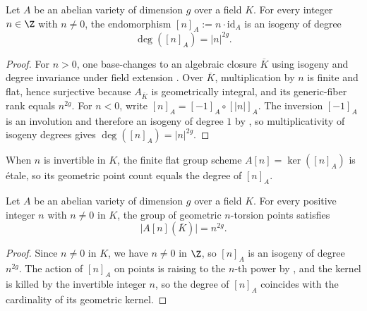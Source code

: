 \begin{theorem}
\label{thm:mul-isogeny}
Let $A$ be an abelian variety of dimension $g$ over a field $K$. For every
integer $n \in \Z$ with $n \neq 0$, the endomorphism $[n]_A := n \cdot \mathrm{id}_A$
is an isogeny of degree
\[
  \deg([n]_A) = |n|^{2g}.
\]
\end{theorem}

\begin{proof}
For $n > 0$, one base-changes to an algebraic closure $\overline{K}$ using
isogeny and degree invariance under field extension
. Over
$\overline{K}$, multiplication by $n$ is finite and flat, hence surjective
because $A_{\overline{K}}$ is geometrically integral, and its generic-fiber
rank equals $n^{2g}$. For $n < 0$, write $[n]_A = [-1]_A \circ [|n|]_A$. The
inversion $[-1]_A$ is an involution and therefore an isogeny of degree $1$ by
, so multiplicativity of isogeny
degrees gives $\deg([n]_A) = |n|^{2g}$.
\end{proof}

When $n$ is invertible in $K$, the finite flat group scheme $A[n] = \ker([n]_A)$
is étale, so its geometric point count equals the degree of $[n]_A$.

\begin{theorem}
\label{thm:card-torsion}
Let $A$ be an abelian variety of dimension $g$ over a field $K$. For every
positive integer $n$ with $n \neq 0$ in $K$, the group of geometric $n$-torsion
points satisfies
\[
  \bigl|A[n](\overline{K})\bigr| = n^{2g}.
\]
\end{theorem}

\begin{proof}
Since $n \neq 0$ in $K$, we have $n \neq 0$ in $\Z$, so $[n]_A$ is an isogeny
of degree $n^{2g}$. The action of $[n]_A$ on points is raising to the $n$-th
power by , and the kernel
is killed by the invertible integer $n$, so the degree of $[n]_A$ coincides
with the cardinality of its geometric kernel.
\end{proof}

